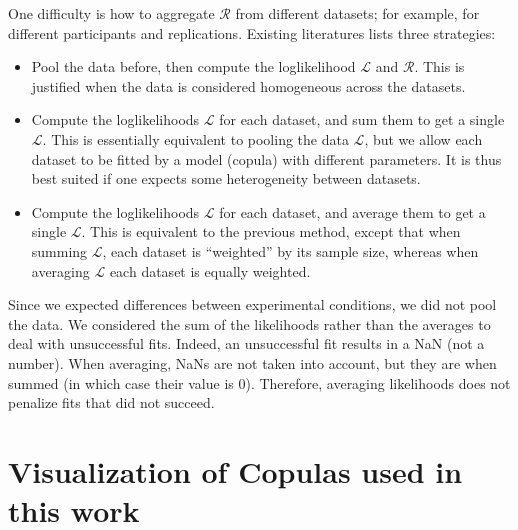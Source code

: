\documentclass[acmlarge, manuscript,review]{acmart}
\begin{document}
One difficulty is how to aggregate $\mathcal{R}$ from different datasets; for example, for different participants and replications. Existing literatures lists three strategies:
\begin{itemize}
	\item Pool the data before, then compute the loglikelihood $\mathcal{L}$ and $\mathcal{R}$. This is justified when the data is considered homogeneous across the datasets.
	\item Compute the loglikelihoods $\mathcal{L}$ for each dataset, and sum them to get a single $\mathcal{L}$. This is essentially equivalent to pooling the data $\mathcal{L}$, but we allow each dataset to be fitted by a model (copula) with different parameters. It is thus best suited if one expects some heterogeneity between datasets.
	\item Compute the loglikelihoods $\mathcal{L}$ for each dataset, and average them to get a single $\mathcal{L}$. This is equivalent to the previous method, except that when summing $\mathcal{L}$, each dataset is ``weighted'' by its sample size, whereas when averaging $\mathcal{L}$ each dataset is equally weighted.
\end{itemize}
Since we expected differences between experimental conditions, we did not pool the data. We considered the sum of the likelihoods rather than the averages to deal with unsuccessful fits. Indeed, an unsuccessful fit results in a NaN (not a number). When averaging, NaNs are not taken into account, but they are when summed (in which case their value is 0). Therefore, averaging likelihoods does not penalize fits that did not succeed.

\section{Visualization of Copulas used in this work}
\end{document}
